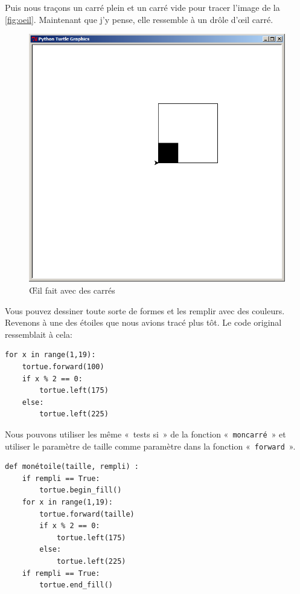 Puis nous traçons un carré plein et un carré vide pour tracer l'image de la \autoref{fig:oeil}. Maintenant que j'y pense, elle ressemble à un drôle d'œil carré.

\begin{figure}[h!]
\centering
\includegraphics[scale=0.4]{images/oeil}
\caption{Œil fait avec des carrés}\label{fig:oeil}
\end{figure}

Vous pouvez dessiner toute sorte de formes et les remplir avec des couleurs. Revenons à une des étoiles que nous avions tracé plus tôt. Le code original ressemblait à cela:
\begin{Verbatim}[frame=single,rulecolor=\color{gray}, label=ne pas saisir]
for x in range(1,19):
    tortue.forward(100)
    if x % 2 == 0:
        tortue.left(175)
    else:
        tortue.left(225)
\end{Verbatim}

Nous pouvons utiliser les même « tests si »  de la fonction « \texttt{moncarré} » et utiliser le paramètre de taille comme paramètre dans la fonction « \texttt{forward} ».

\begin{Verbatim}[frame=single,rulecolor=\color{mbleu}, label=à taper]
def monétoile(taille, rempli) :
    if rempli == True:
        tortue.begin_fill()
    for x in range(1,19):
        tortue.forward(taille)
        if x % 2 == 0:
            tortue.left(175)
        else:
            tortue.left(225)
    if rempli == True:
        tortue.end_fill()
\end{Verbatim}

